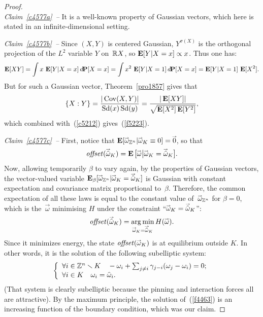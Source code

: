 \begin{proof}\strut\\
\indent\textit{Claim~\ref{c4577a}\ --}
It is a well-known property of Gaussian vectors,
which here is stated in an infinite-dimensional setting.

\indent\textit{Claim~\ref{c4577b}\ --}
Since $(X,Y)$ is centered Gaussian,
$Y^{\sigma(X)}$ is the orthogonal projection of the $L^2$ variable $Y$ on~$\mathbb{R} X$,
so $\mathop{\smash{\mathbf{E}}}\nolimits[Y|X=x] \propto x$.
Thus one has:
\[\label{c5212} \EE[XY] = \int x\, \EE[Y|X=x]\, \dx\Pr[X=x] \\
= \int x^2\, \EE[Y|X=1]\, \dx\Pr[X=x] = \EE[Y|X=1] \, \EE[X^2] .\]
But for such a Gaussian vector, Theorem~\ref{pro1857} gives that
\[ \{X:Y\} = \frac{|\operatorname{Cov}(X,Y)|}{\operatorname{Sd}(x)\operatorname{Sd}(y)} = \frac{|\mathop{\smash{\mathbf{E}}}\nolimits[XY]|}{\sqrt{\mathop{\smash{\mathbf{E}}}\nolimits[X^2]\mathop{\smash{\mathbf{E}}}\nolimits[Y^2]}} ,\]
which combined with~(\ref{c5212}) gives~(\ref{f5223}).

\indent\textit{Claim~\ref{c4577c}\ --} First, notice that
$\EE[\vec\omega_{\ZZ^n}|\vec\omega_K\equiv0] = \vec0$, so that
\[\offset(\vechat{\omega}_K) =
\EE\big[\vec\omega \big| \vec\omega_K=\vechat{\omega}_K \big] .\]
Now, allowing temporarily $\beta$ to vary again, by the properties of Gaussian vectors,
the vector-valued variable $\EE_\beta[\vec\omega_{\ZZ^n}|\vec\omega_K=\vechat{\omega}_K]$
is Gaussian with constant expectation and covariance matrix proportional to~$\beta$.
Therefore, the common expectation of all these laws
is equal to the constant value of~$\vec\omega_{\ZZ^n}$ for $\beta=0$,
which is the~$\vec\omega$ minimising $H$ under the constraint ``$\vec\omega_K=\vechat{\omega}_K$'':
\[ \offset(\vechat{\omega}_K) =
\argmin_{\vec\omega_K=\vechat{\omega}_K} H(\vec\omega) .\]
%
Since it minimizes energy, the state $\offset(\vec\omega_K)$ is at equilibrium outside $K$.
In other words, it is the solution of the following subelliptic system:
\[\label{f4463} \left\{ \begin{array}{ll}
\forall i\in\ZZ^n\setminus K
\quad -\omega_i + \sum_{j\neq i} \gamma_{j-i}(\omega_j-\omega_i) = 0 ;\\
\forall i\in K \quad \omega_i = \hat\omega_i .\end{array} \right.\]
(That system is clearly subelliptic
because the pinning and interaction forces all are attractive).
By the maximum principle,
the solution of~(\ref{f4463}) is an increasing function of the boundary condition,
which was our claim.


\end{proof}
